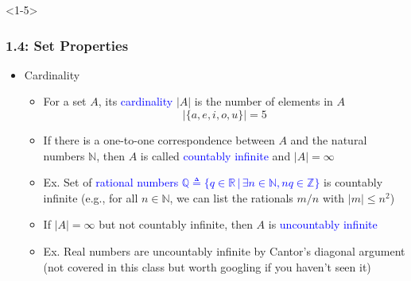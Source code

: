 \documentclass[10pt,english,aspectratio=169]{beamer}
\begin{document}

\begin{frame}<1-5> \frametitle{1.4: Set Properties}

\begin{itemize}
\setlength\itemsep{3mm}

\item<1-> Cardinality \vspace{1mm}
\begin{itemize} 
  \setlength\itemsep{2mm}
  \item<1-> For a set $A$, its \textcolor{blue}{cardinality} $|A|$ is the number of elements in $A$
  \[ |\{ a,e,i,o,u \}| = 5 \]
  \item<2-> If there is a one-to-one correspondence between $A$ and the natural numbers $\mathbb{N}$, then $A$ is called \textcolor{blue}{countably infinite} and  $|A| = \infty$
  \item<3-> Ex. Set of \textcolor{blue}{rational numbers $\mathbb{Q} \triangleq \{ q \in \mathbb{R} \,|\, \exists n \in \mathbb{N}, nq \in \mathbb{Z} \}$} is countably infinite (e.g., for all $n\in \mathbb{N}$, we can list the rationals $m/n$ with $|m|\leq n^2$)
  \item<4-> If $|A| = \infty$ but not countably infinite, then $A$ is \textcolor{blue}{uncountably infinite}
  \item<5-> Ex. Real numbers are uncountably infinite by Cantor's diagonal argument \\ (not covered in this class but worth googling if you haven't seen it)
  

\end{itemize}
\end{itemize}
\end{frame}
\end{document}
